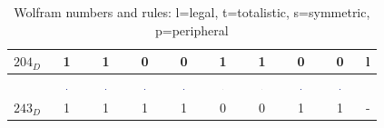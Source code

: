 \documentclass[10pt,a4paper,boxed]{hmcpset}
\begin{document}
\begin{table}[h!]
\begin{tabular}{|c|c|c|c|c|c|c|c|c|c|}
		$204_D$ & 1 & 1 & 0 & 0 & 1 & 1 & 0 & 0 & l \\ 
		\hline  & \includegraphics[width=0.03\textwidth]{img/1.pdf} & \includegraphics[width=0.03\textwidth]{img/1.pdf} & \includegraphics[width=0.03\textwidth]{img/1.pdf} & \includegraphics[width=0.03\textwidth]{img/1.pdf} & \includegraphics[width=0.03\textwidth]{img/0.pdf} & \includegraphics[width=0.03\textwidth]{img/0.pdf} & \includegraphics[width=0.03\textwidth]{img/1.pdf} & \includegraphics[width=0.03\textwidth]{img/1.pdf} &  \\ 
		$243_D$ & 1 & 1 & 1 & 1 & 0 & 0 & 1 & 1 & - \\  
		\hline 
		\end{tabular} 
	\caption{Wolfram numbers and rules: l=legal, t=totalistic, s=symmetric, p=peripheral}
	\end{table}
\begin{solution}
\end{solution}

\begin{problem}[Assignment 15]
\end{problem}
\begin{solution}
\end{solution}
\end{document}
